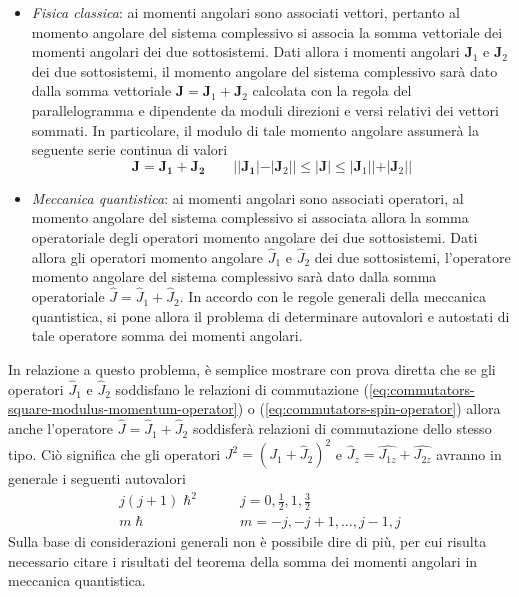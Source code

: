 \begin{itemize}
    \tightlist
    \item
    \emph{Fisica classica}: ai momenti angolari sono associati vettori,
    pertanto al momento angolare del sistema complessivo si associa la
    somma vettoriale dei momenti angolari dei due sottosistemi.
    Dati
    allora i momenti angolari \(\bm{J}_{1}\) e \(\bm{J}_{2}\) dei due
    sottosistemi, il momento angolare del sistema complessivo sarà dato
    dalla somma vettoriale \(\bm{J} = \bm{J}_{1}+ \bm{J}_{2}\) calcolata
    con la regola del parallelogramma e dipendente da moduli direzioni e
    versi relativi dei vettori sommati.
    In particolare, il modulo di tale
    momento angolare assumerà la seguente serie continua di valori \[
                                                                        \bm{J} = \bm{J_{1}} + \bm{J_{2}} \qquad | |\bm{J_{1}}| - |\bm{J}_{2}| | \leq | \bm{J}| \leq|\bm{J}_{1} | | + | \bm{J}_{2} | |
    \]
    \item \emph{Meccanica quantistica}: ai momenti angolari sono associati
    operatori, al momento angolare del sistema complessivo si associata
    allora la somma operatoriale degli operatori momento angolare dei due
    sottosistemi.
    Dati allora gli operatori momento angolare
    \(\hat{J}_{1}\) e \(\hat{J}_{2}\) dei due sottosistemi, l'operatore
    momento angolare del sistema complessivo sarà dato dalla somma
    operatoriale \(\hat{J} = \hat{J}_{1}+ \hat{J}_{2}\).
    In accordo con le
    regole generali della meccanica quantistica, si pone allora il
    problema di determinare autovalori e autostati di tale operatore somma
    dei momenti angolari.
\end{itemize}

In relazione a questo problema, è semplice mostrare con prova diretta
che se gli operatori \(\hat{J}_{1}\) e \(\hat{J}_{2}\) soddisfano le
relazioni di commutazione (\ref{eq:commutators-square-modulus-momentum-operator}) o (\ref{eq:commutators-spin-operator})
allora anche l'operatore
\(\hat{J} = \hat{J}_{1}+ \hat{J}_{2}\) soddisferà relazioni di
commutazione dello stesso tipo.
Ciò significa che gli operatori
\(J^{2} = (J_{1} + \hat{J}_{2})^{2}\) e
\(\hat{J}_{z} = \hat{J_{1z}} + \hat{J_{2z}}\) avranno in generale i
seguenti autovalori
\begin{align*}
    j(j+1) \hslash^{2} \qquad & j = 0, \frac{1}{2}, 1, \frac{3}{2}\\
    m \hslash  \qquad \quad & m = -j , -j +1, \dots , j-1, j
\end{align*} Sulla base di considerazioni generali non è possibile dire di più,
per cui risulta necessario citare i risultati del teorema della somma
dei momenti angolari in meccanica quantistica.

